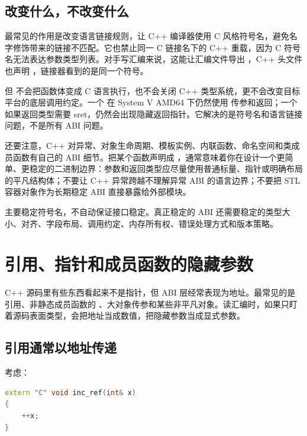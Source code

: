 \subsection{ 改变什么，不改变什么}

 最常见的作用是改变语言链接规则，让 C++ 编译器使用 C 风格符号名，避免名字修饰带来的链接不匹配。它也禁止同一 C 链接名下的 C++ 重载，因为 C 符号名无法表达参数类型列表。对手写汇编来说，这能让汇编文件导出 ，C++ 头文件也声明 ，链接器看到的是同一个符号。

但  不会把函数体变成 C 语言执行，也不会关闭 C++ 类型系统，更不会改变目标平台的底层调用约定。一个  在 System V AMD64 下仍然使用  传参和返回；一个  如果返回类型需要 sret，仍然会出现隐藏返回指针。它解决的是符号名和语言链接问题，不是所有 ABI 问题。

还要注意，C++ 对异常、对象生命周期、模板实例、内联函数、命名空间和类成员函数有自己的 ABI 细节。把某个函数声明成 ，通常意味着你在设计一个更简单、更稳定的二进制边界：参数和返回类型应尽量使用普通标量、指针或明确布局的平凡结构体；不要让 C++ 异常跨越不理解异常 ABI 的语言边界；不要把 STL 容器对象作为长期稳定 ABI 直接暴露给外部模块。

\begin{keyidea}
 主要稳定符号名，不自动保证接口稳定。真正稳定的 ABI 还需要稳定的类型大小、对齐、字段布局、调用约定、内存所有权、错误处理方式和版本策略。
\end{keyidea}

\section{引用、指针和成员函数的隐藏参数}

C++ 源码里有些东西看起来不是指针，但 ABI 层经常表现为地址。最常见的是引用、非静态成员函数的 、大对象传参和某些非平凡对象。读汇编时，如果只盯着源码表面类型，会把地址当成数值，把隐藏参数当成显式参数。

\subsection{引用通常以地址传递}

考虑：

\begin{lstlisting}[language=C++]
extern "C" void inc_ref(int& x)
{
    ++x;
}
\end{lstlisting}

